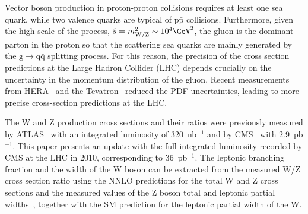 Vector boson production in proton-proton collisions requires at least one sea quark,
while two valence quarks are typical of $\mathrm{p}\bar{\mathrm{p}}$ collisions. 
Furthermore, given the high scale of the process, 
${\hat s} = m_{\Wo/\Zo}^2\sim 10^4\GeV^2$, the gluon is the dominant parton 
in the proton so that the scattering sea quarks are mainly generated by the 
$\mathrm{g} \rightarrow \mathrm{q} \bar{\mathrm{q}}$ splitting process.
For this reason, the precision of the cross section predictions
at the Large Hadron Collider (LHC) depends crucially on the uncertainty 
in the momentum distribution of the gluon.
Recent measurements from HERA~\cite{HERApdf} and the
Tevatron~\cite{TevatronPdf_1, TevatronPdf_2, 
TevatronPdf_4, TevatronPdf_5, TevatronPdf_6, TevatronPdf_7, TevatronPdf_8, TevatronPdf_9, TevatronPdf_10} 
reduced the PDF uncertainties, leading to more precise
cross-section predictions at the LHC. 


The W and Z production cross sections and their ratios were
previously measured by \mbox{ATLAS}~\cite{WZATLAS:2010} with
an integrated luminosity of 320~nb$^{-1}$ and by 
CMS~\cite{WZCMS:2010} with 2.9~pb$^{-1}$. 
%
%
This paper presents an update with the full integrated luminosity recorded by CMS at the LHC 
in 2010, corresponding to 36~pb$^{-1}$.
The leptonic branching fraction and the width of the W boson can be extracted from the 
measured W/Z cross section ratio 
using the NNLO predictions for the total W and Z cross sections and the measured 
values of the Z boson total and leptonic partial widths~\cite{LEPZ}, together with the SM
prediction for the leptonic partial width of the W. 

